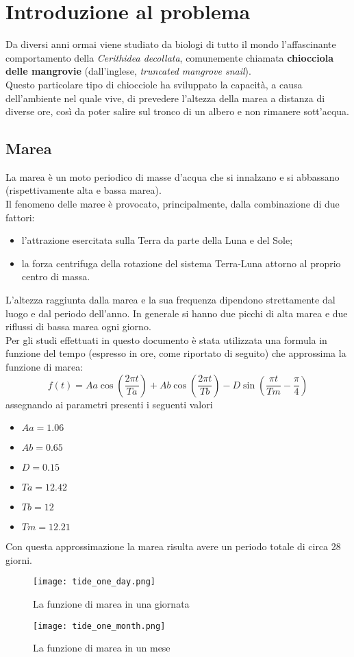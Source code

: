 	\chapter{Introduzione al problema}
		Da diversi anni ormai viene studiato da biologi di tutto il mondo l'affascinante comportamento della \textit{Cerithidea decollata}, comunemente chiamata \textbf{chiocciola delle mangrovie} (dall'inglese, \textit{truncated mangrove snail}).\\
		Questo particolare tipo di chiocciole ha sviluppato la capacità, a causa dell'ambiente nel quale vive, di prevedere l'altezza della marea a distanza di diverse ore, così da poter salire sul tronco di un albero e non rimanere sott'acqua.
		
		\section{Marea}
			
			La marea è un moto periodico di masse d'acqua che si innalzano e si abbassano (rispettivamente alta e bassa marea).\\
			Il fenomeno delle maree è provocato, principalmente, dalla combinazione di due fattori:
			\begin{itemize}
				\item l'attrazione esercitata sulla Terra da parte della Luna e del Sole;
				\item la forza centrifuga della rotazione del sistema Terra-Luna attorno al proprio centro di massa.
			\end{itemize}
			L'altezza raggiunta dalla marea e la sua frequenza dipendono strettamente dal luogo e dal periodo dell'anno. In generale si hanno due picchi di alta marea e due riflussi di bassa marea ogni giorno.\\
			Per gli studi effettuati in questo documento è stata utilizzata una formula in funzione del tempo (espresso in ore, come riportato di seguito) che approssima la funzione di marea:
			\[f(t) = Aa \cos \left(\frac{2 \pi t}{Ta}\right) + Ab \cos \left(\frac{2 \pi t}{Tb}\right) - D \sin \left(\frac{\pi t}{Tm} - \frac{\pi}{4}\right)\]
			assegnando ai parametri presenti i seguenti valori
			\begin{itemize}
				\item \( Aa = 1.06 \)
				\item \( Ab = 0.65 \)
				\item \( D = 0.15 \)
				\item \( Ta = 12.42 \)
				\item \( Tb = 12 \)
				\item \( Tm = 12.21 \)
			\end{itemize}
			Con questa approssimazione la marea risulta avere un periodo totale di circa 28 giorni.
			\begin{figure}[h]
				\centering
				\texttt{[image: tide\_one\_day.png]}
				\caption{La funzione di marea in una giornata}
			\end{figure}
			\begin{figure}[h]
				\centering
				\texttt{[image: tide\_one\_month.png]}
				\caption{La funzione di marea in un mese}
			\end{figure}
			\FloatBarrier
			
